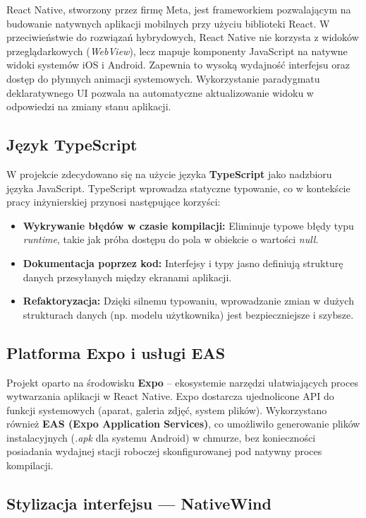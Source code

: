 React Native, stworzony przez firmę Meta, jest frameworkiem pozwalającym na budowanie natywnych aplikacji mobilnych przy użyciu biblioteki React. W przeciwieństwie do rozwiązań hybrydowych, React Native nie korzysta z widoków przeglądarkowych (\textit{WebView}), lecz mapuje komponenty JavaScript na natywne widoki systemów iOS i Android. Zapewnia to wysoką wydajność interfejsu oraz dostęp do płynnych animacji systemowych. Wykorzystanie paradygmatu deklaratywnego UI pozwala na automatyczne aktualizowanie widoku w odpowiedzi na zmiany stanu aplikacji.

\subsection{Język TypeScript}

W projekcie zdecydowano się na użycie języka \textbf{TypeScript} jako nadzbioru języka JavaScript. TypeScript wprowadza statyczne typowanie, co w kontekście pracy inżynierskiej przynosi następujące korzyści:
\begin{itemize}
\item \textbf{Wykrywanie błędów w czasie kompilacji:} Eliminuje typowe błędy typu \textit{runtime}, takie jak próba dostępu do pola w obiekcie o wartości \textit{null}.
\item \textbf{Dokumentacja poprzez kod:} Interfejsy i typy jasno definiują strukturę danych przesyłanych między ekranami aplikacji.
\item \textbf{Refaktoryzacja:} Dzięki silnemu typowaniu, wprowadzanie zmian w dużych strukturach danych (np. modelu użytkownika) jest bezpieczniejsze i szybsze.
\end{itemize}

\subsection{Platforma Expo i usługi EAS}

Projekt oparto na środowisku \textbf{Expo} – ekosystemie narzędzi ułatwiających proces wytwarzania aplikacji w React Native. Expo dostarcza ujednolicone API do funkcji systemowych (aparat, galeria zdjęć, system plików). Wykorzystano również \textbf{EAS (Expo Application Services)}, co umożliwiło generowanie plików instalacyjnych (\textit{.apk} dla systemu Android) w chmurze, bez konieczności posiadania wydajnej stacji roboczej skonfigurowanej pod natywny proces kompilacji.

\subsection{Stylizacja interfejsu --- NativeWind}

